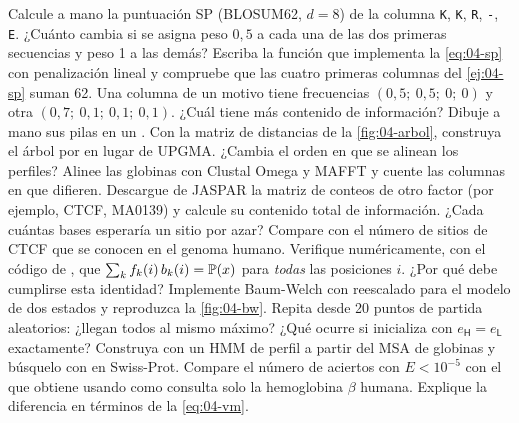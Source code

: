 \begin{ejercicios}
 Calcule a mano la puntuación SP (BLOSUM62, $d=8$) de la columna \texttt{K}, \texttt{K}, \texttt{R}, \texttt{-}, \texttt{E}. ¿Cuánto cambia si se asigna peso $0{,}5$ a cada una de las dos primeras secuencias y peso 1 a las demás?
 Escriba la función  que implementa la \cref{eq:04-sp} con penalización lineal y compruebe que las cuatro primeras columnas del \cref{ej:04-sp} suman 62.
 Una columna de un motivo tiene frecuencias $(0{,}5;\ 0{,}5;\ 0;\ 0)$ y otra $(0{,}7;\ 0{,}1;\ 0{,}1;\ 0{,}1)$. ¿Cuál tiene más contenido de información? Dibuje a mano sus pilas en un .
 Con la matriz de distancias de la \cref{fig:04-arbol}, construya el árbol por  en lugar de UPGMA. ¿Cambia el orden en que se alinean los perfiles? Alinee las globinas con Clustal Omega y MAFFT y cuente las columnas en que difieren.
 Descargue de JASPAR la matriz de conteos de otro factor (por ejemplo, CTCF, MA0139) y calcule su contenido total de información. ¿Cada cuántas bases esperaría un sitio por azar? Compare con el número de sitios de CTCF que se conocen en el genoma humano.
 Verifique numéricamente, con el código de , que $\sum_k f_k(i)\,b_k(i)=\mathbb{P}(x)$ para \emph{todas} las posiciones $i$. ¿Por qué debe cumplirse esta identidad?
 Implemente Baum-Welch con reescalado para el modelo de dos estados y reproduzca la \cref{fig:04-bw}. Repita desde 20 puntos de partida aleatorios: ¿llegan todos al mismo máximo? ¿Qué ocurre si inicializa con $e_{\textsf{H}}=e_{\textsf{L}}$ exactamente?
 Construya con  un HMM de perfil a partir del MSA de globinas y búsquelo con  en Swiss-Prot. Compare el número de aciertos con $E<10^{-5}$ con el que obtiene  usando como consulta solo la hemoglobina $\beta$ humana. Explique la diferencia en términos de la \cref{eq:04-vm}.
\end{ejercicios}

